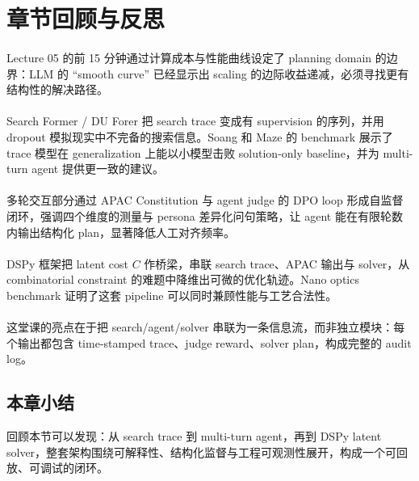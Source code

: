 \section{章节回顾与反思}

\paragraph{}
Lecture 05 的前 15 分钟通过计算成本与性能曲线设定了 planning domain 的边界：LLM 的 ``smooth curve'' 已经显示出 scaling 的边际收益递减，必须寻找更有结构性的解决路径。

\paragraph{}
Search Former / DU Forer 把 search trace 变成有 supervision 的序列，并用 dropout 模拟现实中不完备的搜索信息。Soang 和 Maze 的 benchmark 展示了 trace 模型在 generalization 上能以小模型击败 solution-only baseline，并为 multi-turn agent 提供更一致的建议。

\paragraph{}
多轮交互部分通过 APAC Constitution 与 agent judge 的 DPO loop 形成自监督闭环，强调四个维度的测量与 persona 差异化问句策略，让 agent 能在有限轮数内输出结构化 plan，显著降低人工对齐频率。

\paragraph{}
DSPy 框架把 latent cost \(C\) 作桥梁，串联 search trace、APAC 输出与 solver，从 combinatorial constraint 的难题中降维出可微的优化轨迹。Nano optics benchmark 证明了这套 pipeline 可以同时兼顾性能与工艺合法性。

\paragraph{}
这堂课的亮点在于把 search/agent/solver 串联为一条信息流，而非独立模块：每个输出都包含 time-stamped trace、judge reward、solver plan，构成完整的 audit log。

\subsection{本章小结}
回顾本节可以发现：从 search trace 到 multi-turn agent，再到 DSPy latent solver，整套架构围绕可解释性、结构化监督与工程可观测性展开，构成一个可回放、可调试的闭环。

